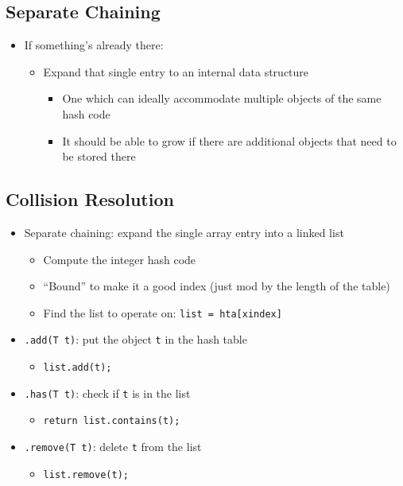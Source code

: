\documentclass[10pt]{article}
\begin{document}
\subsection*{Separate Chaining}
\begin{itemize}
    \item If something's already there:
    \begin{itemize}
        \item Expand that single entry to an internal data structure
        \begin{itemize}
            \item One which can ideally accommodate multiple objects of the same hash code
            \item It should be able to grow if there are additional objects that need to be stored there
        \end{itemize}
    \end{itemize}
\end{itemize}

\subsection*{Collision Resolution}
\begin{itemize}
    \item Separate chaining: expand the single array entry into a linked list
    \begin{itemize}
        \item Compute the integer hash code
        \item ``Bound'' to make it a good index (just mod by the length of the table)
        \item Find the list to operate on: \texttt{list = hta[xindex]}
    \end{itemize}
    \item \texttt{.add(T t)}: put the object \texttt{t} in the hash table
    \begin{itemize}
        \item \texttt{list.add(t);}
    \end{itemize}
    \item \texttt{.has(T t)}: check if \texttt{t} is in the list
    \begin{itemize}
        \item \texttt{return list.contains(t);}
    \end{itemize}
    \item \texttt{.remove(T t)}: delete \texttt{t} from the list
    \begin{itemize}
        \item \texttt{list.remove(t);}
    \end{itemize}
\end{itemize}
\end{document}
